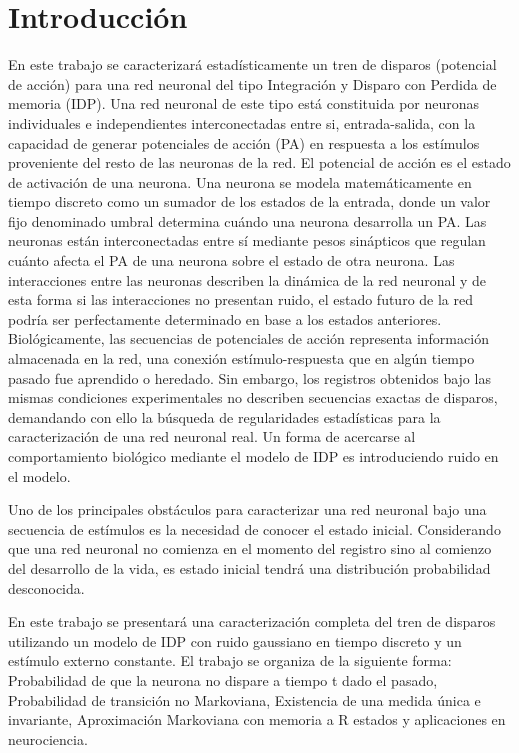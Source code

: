 \section{Introducción}
En este trabajo se caracterizará estadísticamente un tren de disparos (potencial de acción) para una red neuronal del tipo Integración y Disparo con Perdida de memoria (IDP). Una red neuronal de este tipo está constituida por neuronas individuales e independientes interconectadas entre si, entrada-salida, con la capacidad de generar potenciales de acción (PA) en respuesta a los estímulos proveniente del resto de las neuronas de la red. El potencial de acción es el estado de activación de una neurona. Una neurona se modela matemáticamente en tiempo discreto como un sumador de los estados de la entrada, donde un valor fijo denominado umbral determina cuándo una neurona desarrolla un PA. Las neuronas están interconectadas entre sí mediante pesos sinápticos que regulan cuánto afecta el PA de una neurona sobre el estado de otra neurona. Las interacciones entre las neuronas describen la dinámica de la red neuronal y de esta forma si las interacciones no presentan ruido, el estado futuro de la red podría ser perfectamente determinado en base a los estados anteriores. Biológicamente, las secuencias de potenciales de acción representa información almacenada en la red, una conexión estímulo-respuesta que en algún tiempo pasado fue aprendido o heredado. Sin embargo, los registros obtenidos bajo las mismas condiciones experimentales no describen secuencias exactas de disparos, demandando con ello la búsqueda de regularidades estadísticas para la caracterización de una red neuronal real. Un forma de acercarse al comportamiento biológico mediante el modelo de IDP es introduciendo ruido en el modelo. 

Uno de los principales obstáculos para caracterizar una red neuronal bajo una secuencia de estímulos es la necesidad de conocer el estado inicial. Considerando que una red neuronal no comienza en el momento del registro sino al comienzo del desarrollo de la vida, es estado inicial tendrá una distribución probabilidad desconocida.

En este trabajo se presentará una caracterización completa del tren de disparos utilizando un modelo de IDP con ruido gaussiano en tiempo discreto y un estímulo externo constante. El trabajo se organiza de la siguiente forma: Probabilidad de que la neurona no dispare a tiempo t dado el pasado, Probabilidad de transición no Markoviana, Existencia de una medida única e invariante, Aproximación Markoviana con memoria a R estados y aplicaciones en neurociencia. 
